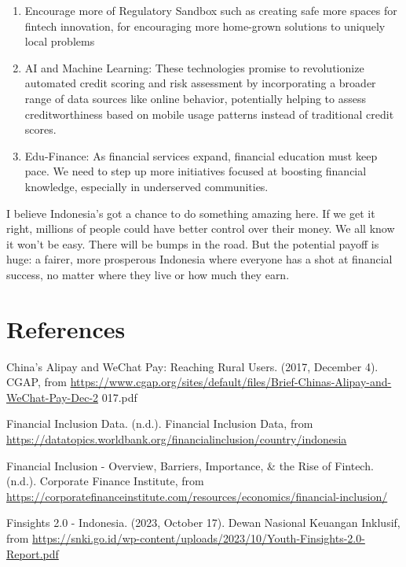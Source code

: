 \documentclass[10pt]{article}
\begin{document}
\begin{enumerate}
  \item Encourage more of Regulatory Sandbox such as creating safe more spaces for fintech innovation, for encouraging more home-grown solutions to uniquely local problems

  \item AI and Machine Learning: These technologies promise to revolutionize automated credit scoring and risk assessment by incorporating a broader range of data sources like online behavior, potentially helping to assess creditworthiness based on mobile usage patterns instead of traditional credit scores.

  \item Edu-Finance: As financial services expand, financial education must keep pace. We need to step up more initiatives focused at boosting financial knowledge, especially in underserved communities.

\end{enumerate}

I believe Indonesia's got a chance to do something amazing here. If we get it right, millions of people could have better control over their money. We all know it won't be easy. There will be bumps in the road. But the potential payoff is huge: a fairer, more prosperous Indonesia where everyone has a shot at financial success, no matter where they live or how much they earn.

\section*{References}
China's Alipay and WeChat Pay: Reaching Rural Users. (2017, December 4). CGAP, from \href{https://www.cgap.org/sites/default/files/Brief-Chinas-Alipay-and-WeChat-Pay-Dec-2}{https://www.cgap.org/sites/default/files/Brief-Chinas-Alipay-and-WeChat-Pay-Dec-2} 017.pdf

Financial Inclusion Data. (n.d.). Financial Inclusion Data, from \href{https://datatopics.worldbank.org/financialinclusion/country/indonesia}{https://datatopics.worldbank.org/financialinclusion/country/indonesia}

Financial Inclusion - Overview, Barriers, Importance, \& the Rise of Fintech. (n.d.). Corporate Finance Institute, from \href{https://corporatefinanceinstitute.com/resources/economics/financial-inclusion/}{https://corporatefinanceinstitute.com/resources/economics/financial-inclusion/}

Finsights 2.0 - Indonesia. (2023, October 17). Dewan Nasional Keuangan Inklusif, from \href{https://snki.go.id/wp-content/uploads/2023/10/Youth-Finsights-2.0-Report.pdf}{https://snki.go.id/wp-content/uploads/2023/10/Youth-Finsights-2.0-Report.pdf}
\end{document}
